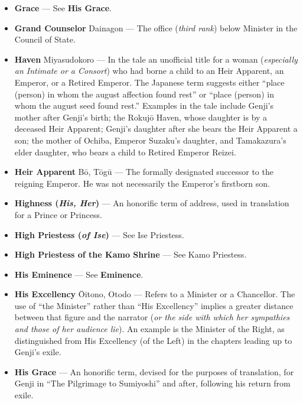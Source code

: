 \documentclass{article}
\begin{document}
\begin{multicols}{2}
\begin{small}
\begin{itemize}[
				label=,
				leftmargin=0em,
				rightmargin=-1.5em,
				itemindent=-2em,
			]
			\item \textbf{Grace} --- See \textbf{His Grace}.

			\item \textbf{Grand Counselor} Dainagon --- The office (\textit{third rank}) below Minister in the Council of State.

			\item \textbf{Haven} Miyasudokoro --- In the tale an unofficial title for a woman (\textit{especially an Intimate or a Consort}) who had borne a child to an Heir Apparent, an Emperor, or a Retired Emperor. The Japanese term suggests either “place (person) in whom the august affection found rest” or “place (person) in whom the august seed found rest.” Examples in the tale include Genji's mother after Genji's birth; the Rokujō Haven, whose daughter is by a deceased Heir Apparent; Genji's daughter after she bears the Heir Apparent a son; the mother of Ochiba, Emperor Suzaku's daughter, and Tamakazura's elder daughter, who bears a child to Retired Emperor Reizei.

			\item \textbf{Heir Apparent} Bō, Tōgū --- The formally designated successor to the reigning Emperor. He was not necessarily the Emperor's firstborn son.

			\item \textbf{Highness (\textit{His, Her})} --- An honorific term of address, used in translation for a Prince or Princess.

			\item \textbf{High Priestess (\textit{of Ise})} --- See Ise Priestess.

			\item \textbf{High Priestess of the Kamo Shrine} --- See Kamo Priestess.

			\item \textbf{His Eminence} --- See \textbf{Eminence}.

			\item \textbf{His Excellency} Ōitono, Otodo --- Refers to a Minister or a Chancellor. The use of “the Minister” rather than “His Excellency” implies a greater distance between that figure and the narrator (\textit{or the side with which her sympathies and those of her audience lie}). An example is the Minister of the Right, as distinguished from His Excellency (of the Left) in the chapters leading up to Genji's exile.

			\item \textbf{His Grace} --- An honorific term, devised for the purposes of translation, for Genji in “The Pilgrimage to Sumiyoshi” and after, following his return from exile.


\end{itemize}
\end{small}
\end{multicols}
\end{document}

